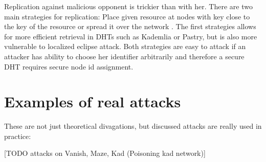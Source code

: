   Replication against malicious opponent is trickier than with her. There are
  two main strategies for replication: Place given resource at nodes with key
  close to the key of the resource or spread it over the network \cite[p.
  38]{urd11}. The first strategies allows for more efficient retrieval in DHTs
  such as Kademlia or Pastry, but is also more vulnerable to localized eclipse
  attack. Both strategies are easy to attack if an attacker has ability to
  choose her identifier arbitrarily and therefore a secure DHT requires secure
  node id assignment.

\section{Examples of real attacks}
These are not just theoretical divagations, but discussed attacks are really
used in practice:

[TODO attacks on Vanish, Maze, Kad (Poisoning kad network)]
